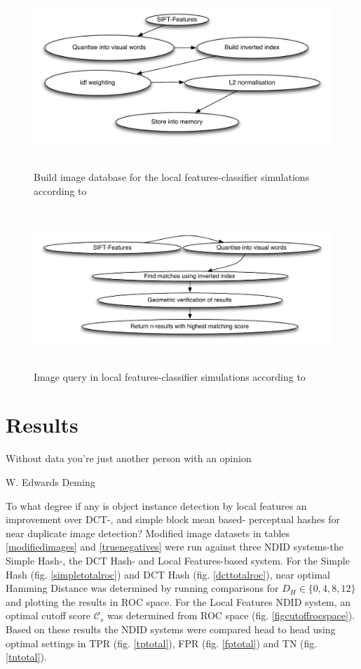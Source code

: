 \documentclass[english,12pt,a4paper,pdftex,elec,utf8]{aaltothesis}
\begin{document}
\begin{figure}[htb]
\begin{center}
\includegraphics[height=7cm]{figures/vedaldigenindex}
\end{center}
\caption{Build image database for the local features-classifier simulations according to \cite{Vedaldi2012}}
\label{vedaldigenindex}
\end{figure}

\begin{figure}[htb]
\begin{center}
\includegraphics[height=6cm]{figures/vedaldiquery}
\end{center}
\caption{Image query in local features-classifier simulations according to \cite{Vedaldi2012}}
\label{vedaldiquery}
\end{figure}

\clearpage

\section{Results}
\epigraph{Without data you're just another person with an opinion}{W. Edwards Deming}
To what degree if any is object instance detection by local features an improvement over DCT-, and simple block mean based- perceptual hashes for near duplicate image detection? Modified image datasets in tables \ref{modifiedimages} and \ref{truenegatives} were run against three NDID systems-the Simple Hash-, the DCT Hash- and Local Features-based system. For the Simple Hash (fig. \ref{simpletotalroc}) and DCT Hash (fig. \ref{dcttotalroc}), near optimal Hamming Distance was determined by running comparisons for $D_H \in \{0,4,8,12\}$ and plotting the results in ROC space. For the Local Features NDID system, an optimal cutoff score $\mathcal{C}_s$ was determined from ROC space (fig. \ref{figcutoffrocspace}). Based on these results the NDID systems were compared head to head using optimal settings in TPR (fig. \ref{tptotal}), FPR (fig. \ref{fptotal}) and TN (fig. \ref{tntotal}).
\end{document}
